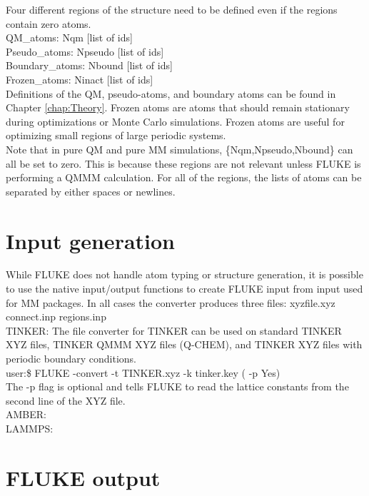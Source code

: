 \documentclass[12pt]{report}
\begin{document}
Four different regions of the structure need to be defined even if the
regions contain zero atoms. \\

QM\_atoms: Nqm [list of ids] \\
Pseudo\_atoms: Npseudo [list of ids] \\
Boundary\_atoms: Nbound [list of ids] \\
Frozen\_atoms: Ninact [list of ids] \\

Definitions of the QM, pseudo-atoms, and boundary atoms can be found in
Chapter \ref{chap:Theory}. Frozen atoms are atoms that should remain
stationary during optimizations or Monte Carlo simulations. Frozen atoms are
useful for optimizing small regions of large periodic systems. \\

Note that in pure QM and pure MM simulations, \{Nqm,Npseudo,Nbound\} can all
be set to zero. This is because these regions are not relevant unless FLUKE is
performing a QMMM calculation. For all of the regions, the lists of atoms can
be separated by either spaces or newlines.

\section{Input generation}

While FLUKE does not handle atom typing or structure generation, it is
possible to use the native input/output functions to create FLUKE input from
input used for MM packages. In all cases the converter produces three
files: xyzfile.xyz connect.inp regions.inp \\

TINKER: The file converter for TINKER can be used on standard
TINKER XYZ files, TINKER QMMM XYZ files (Q-CHEM), and TINKER XYZ files
with periodic boundary conditions. \\

user:\$ FLUKE -convert -t TINKER.xyz -k tinker.key ( -p Yes) \\

The -p flag is optional and tells FLUKE to read the lattice constants from
the second line of the XYZ file. \\

AMBER: \\

LAMMPS:

\section{FLUKE output}
\end{document}
